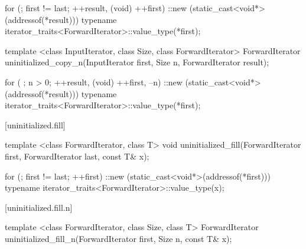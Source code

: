 \begin{itemdescr}
\pnum
\effects
\begin{codeblock}
for (; first != last; ++result, (void) ++first)
  ::new (static_cast<void*>(addressof(*result)))
    typename iterator_traits<ForwardIterator>::value_type(*first);
\end{codeblock}

\pnum
\returns
{}
\end{itemdescr}

%
\begin{itemdecl}
template <class InputIterator, class Size, class ForwardIterator>
  ForwardIterator uninitialized_copy_n(InputIterator first, Size n,
                                       ForwardIterator result);
\end{itemdecl}

\begin{itemdescr}
\pnum
\effects
\begin{codeblock}
for ( ; n > 0; ++result, (void) ++first, --n) {
  ::new (static_cast<void*>(addressof(*result)))
    typename iterator_traits<ForwardIterator>::value_type(*first);
}
\end{codeblock}

\pnum
\returns {}
\end{itemdescr}


[uninitialized.fill]{}

%
\begin{itemdecl}
template <class ForwardIterator, class T>
  void uninitialized_fill(ForwardIterator first, ForwardIterator last,
                          const T& x);
\end{itemdecl}

\begin{itemdescr}
\pnum
\effects
\begin{codeblock}
for (; first != last; ++first)
  ::new (static_cast<void*>(addressof(*first)))
    typename iterator_traits<ForwardIterator>::value_type(x);
\end{codeblock}
\end{itemdescr}

[uninitialized.fill.n]{}

%
\begin{itemdecl}
template <class ForwardIterator, class Size, class T>
  ForwardIterator uninitialized_fill_n(ForwardIterator first, Size n, const T& x);
\end{itemdecl}

